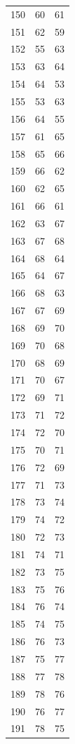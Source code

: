 \documentclass[a4paper,11pt]{article}
\begin{document}
\begin{center}
\begin{longtable}{|R{1.5cm}|R{1.5cm}|R{1.5cm}|}
  150 &   60 &   61 \\
  151 &   62 &   59 \\
  152 &   55 &   63 \\
  153 &   63 &   64 \\
  154 &   64 &   53 \\
  155 &   53 &   63 \\
  156 &   64 &   55 \\
  157 &   61 &   65 \\
  158 &   65 &   66 \\
  159 &   66 &   62 \\
  160 &   62 &   65 \\
  161 &   66 &   61 \\
  162 &   63 &   67 \\
  163 &   67 &   68 \\
  164 &   68 &   64 \\
  165 &   64 &   67 \\
  166 &   68 &   63 \\
  167 &   67 &   69 \\
  168 &   69 &   70 \\
  169 &   70 &   68 \\
  170 &   68 &   69 \\
  171 &   70 &   67 \\
  172 &   69 &   71 \\
  173 &   71 &   72 \\
  174 &   72 &   70 \\
  175 &   70 &   71 \\
  176 &   72 &   69 \\
  177 &   71 &   73 \\
  178 &   73 &   74 \\
  179 &   74 &   72 \\
  180 &   72 &   73 \\
  181 &   74 &   71 \\
  182 &   73 &   75 \\
  183 &   75 &   76 \\
  184 &   76 &   74 \\
  185 &   74 &   75 \\
  186 &   76 &   73 \\
  187 &   75 &   77 \\
  188 &   77 &   78 \\
  189 &   78 &   76 \\
  190 &   76 &   77 \\
  191 &   78 &   75 \\

\end{longtable}
\end{center}
\end{document}
